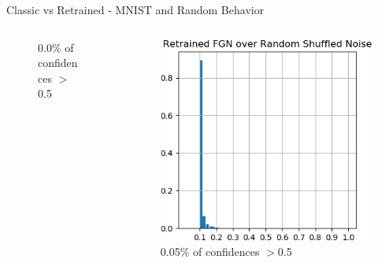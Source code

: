 \documentclass{beamer}
\begin{document}
\begin{frame}{Classic vs Retrained - MNIST and Random Behavior}
\begin{columns}
\begin{column}{.33\textwidth}
\begin{figure}
        \centering \tiny{0.0\% of confidences $>$0.5}
    \end{figure}
    \end{column}
    \begin{column}{.33\textwidth}
    \begin{figure}
        \centering
        \includegraphics[width=.9\textwidth]{images/mnist-behavior/retrained-hist-shuffled.png}
        \centering \tiny{0.05\% of confidences $>$0.5}
    \end{figure}
    \end{column}
    \end{columns}
    
\end{frame}
\end{document}
